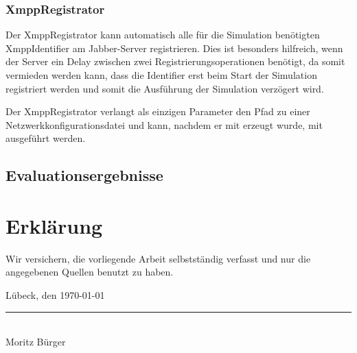 \subsection{XmppRegistrator}
Der XmppRegistrator kann automatisch alle für die Simulation benötigten XmppIdentifier am Jabber-Server registrieren. Dies ist besonders hilfreich, wenn der Server ein Delay zwischen zwei Registrierungsoperationen benötigt, da somit vermieden werden kann, dass die Identifier erst beim Start der Simulation registriert werden und somit die Ausführung der Simulation verzögert wird.

Der XmppRegistrator verlangt als einzigen Parameter den Pfad zu einer Netzwerkkonfigurationsdatei und kann, nachdem er mit  erzeugt wurde, mit  ausgeführt werden.

\section{Evaluationsergebnisse}\label{sec:appendix_C}

\chapter*{Erklärung}
\thispagestyle{empty}
Wir versichern, die vorliegende Arbeit selbstständig verfasst und nur die
angegebenen Quellen benutzt zu haben.


\vspace*{5cm}
Lübeck, den \today \hspace*{1cm} \rule{0.3\textwidth}{0.4pt}\\
\noindent\hspace{3em}Moritz Bürger
\vspace{2em}